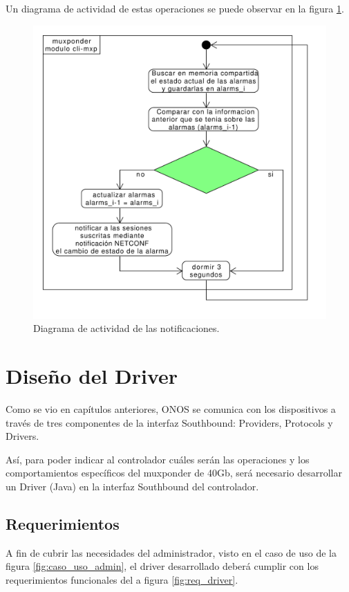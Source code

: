   Un diagrama de actividad de estas operaciones se puede observar en la figura \ref{fig:actividad_modulo_asinc}.

  \begin{figure}[H]
    \centering
    \includegraphics[scale=0.50]{Figures/actividad_modulo_asinc.pdf}
    \caption{Diagrama de actividad de las notificaciones.}
    \label{fig:actividad_modulo_asinc}
  \end{figure}


  \section{Diseño del Driver}
  Como se vio en capítulos anteriores, ONOS se comunica con los dispositivos a través de tres componentes de la interfaz Southbound: Providers, Protocols y Drivers.
  
  Así, para poder indicar al controlador cuáles serán las operaciones y los comportamientos específicos del muxponder de 40Gb, será necesario desarrollar un Driver (Java) en la interfaz Southbound del controlador. 

  \subsection{Requerimientos}
  A fin de cubrir las necesidades del administrador, visto en el caso de uso de la figura \ref{fig:caso_uso_admin}, el driver desarrollado deberá cumplir con los requerimientos funcionales del a figura \ref{fig:req_driver}.
  
